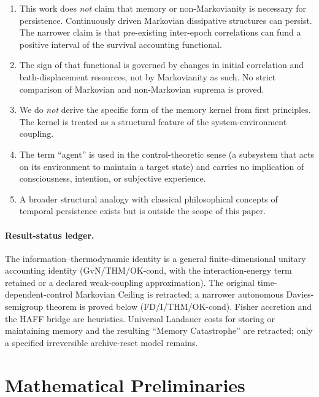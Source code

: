 \documentclass[12pt,a4paper,openany]{book}
\begin{document}
\begin{enumerate}
\item This work does \emph{not} claim that memory or
  non-Markovianity is necessary for persistence.  Continuously driven
  Markovian dissipative structures can persist.  The narrower claim is
  that pre-existing inter-epoch correlations can fund a positive
  interval of the survival accounting functional.
\item The sign of that functional is governed by changes in initial
  correlation and bath-displacement resources, not by Markovianity as
  such.  No strict comparison of Markovian and non-Markovian suprema is
  proved.
\item We do \emph{not} derive the specific form of the memory
  kernel from first principles. The kernel is treated as a
  structural feature of the system-environment coupling.
\item The term ``agent'' is used in the control-theoretic sense
  (a subsystem that acts on its environment to maintain a target
  state) and carries no implication of consciousness, intention,
  or subjective experience.
\item A broader structural analogy with classical philosophical
  concepts of temporal persistence exists but is outside the
  scope of this paper.
\end{enumerate}

\paragraph{Result-status ledger.}
The information--thermodynamic identity is a general finite-dimensional
unitary accounting identity (GvN/THM/OK-cond, with the interaction-energy
term retained or a declared weak-coupling approximation).  The original
time-dependent-control Markovian Ceiling is retracted; a narrower
autonomous Davies-semigroup theorem is proved below (FD/I/THM/OK-cond).
Fisher accretion and the HAFF bridge are heuristics.  Universal
Landauer costs for storing or maintaining memory and the resulting
``Memory Catastrophe'' are retracted; only a specified irreversible
archive-reset model remains.

\section{Mathematical Preliminaries}
\label{T-I-sec:prelim}

\end{document}
